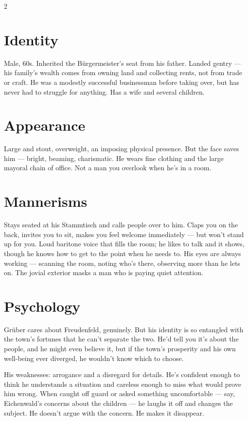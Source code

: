\documentclass[10pt,letterpaper]{article}
\begin{document}
\begin{multicols}{2}

\section*{Identity}
Male, 60s. Inherited the Bürgermeister's seat from his father. Landed gentry --- his family's wealth comes from owning land and collecting rents, not from trade or craft. He was a modestly successful businessman before taking over, but has never had to struggle for anything. Has a wife and several children.

\section*{Appearance}
Large and stout, overweight, an imposing physical presence. But the face saves him --- bright, beaming, charismatic. He wears fine clothing and the large mayoral chain of office. Not a man you overlook when he's in a room.

\section*{Mannerisms}
Stays seated at his Stammtisch and calls people over to him. Claps you on the back, invites you to sit, makes you feel welcome immediately --- but won't stand up for you. Loud baritone voice that fills the room; he likes to talk and it shows, though he knows how to get to the point when he needs to. His eyes are always working --- scanning the room, noting who's there, observing more than he lets on. The jovial exterior masks a man who is paying quiet attention.

\section*{Psychology}
Grüber cares about Freudenfeld, genuinely. But his identity is so entangled with the town's fortunes that he can't separate the two. He'd tell you it's about the people, and he might even believe it, but if the town's prosperity and his own well-being ever diverged, he wouldn't know which to choose.

His weaknesses: arrogance and a disregard for details. He's confident enough to think he understands a situation and careless enough to miss what would prove him wrong. When caught off guard or asked something uncomfortable --- say, Eichenwald's concerns about the children --- he laughs it off and changes the subject. He doesn't argue with the concern. He makes it disappear.


\end{multicols}
\end{document}

